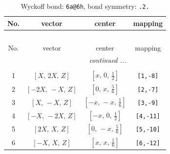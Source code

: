 \documentclass[fleqn,8pt]{jsarticle}
\begin{document}
\renewcommand{\arraystretch}{1.2}
\begin{longtable}{cccc}
\caption{Wyckoff bond: {\tt 6a@6h}, bond symmetry: {\tt .2.}}
 \\
 \hline \hline
No. & vector & center & mapping \\ \hline \endfirsthead

\multicolumn{3}{l}{\tablename\ \thetable{}} \\
 \hline \hline
No. & vector & center & mapping \\ \hline \endhead

 \hline \hline
\multicolumn{3}{r}{\footnotesize\it continued ...} \\ \endfoot

 \hline \hline
\multicolumn{3}{r}{} \\ \endlastfoot

1 & $\left[ X,\, 2 X,\, Z \right]$ & $\left[ x,\, 0,\, \frac{1}{2} \right]$ & {\tt [1,-8]} \\ \hline
2 & $\left[ - 2 X,\, - X,\, Z \right]$ & $\left[ 0,\, x,\, \frac{5}{6} \right]$ & {\tt [2,-7]} \\ \hline
3 & $\left[ X,\, - X,\, Z \right]$ & $\left[ - x,\, - x,\, \frac{1}{6} \right]$ & {\tt [3,-9]} \\ \hline
4 & $\left[ - X,\, - 2 X,\, Z \right]$ & $\left[ - x,\, 0,\, \frac{1}{2} \right]$ & {\tt [4,-11]} \\ \hline
5 & $\left[ 2 X,\, X,\, Z \right]$ & $\left[ 0,\, - x,\, \frac{5}{6} \right]$ & {\tt [5,-10]} \\ \hline
6 & $\left[ - X,\, X,\, Z \right]$ & $\left[ x,\, x,\, \frac{1}{6} \right]$ & {\tt [6,-12]} \\
\end{longtable}
\renewcommand{\arraystretch}{1.2}
\end{document}
